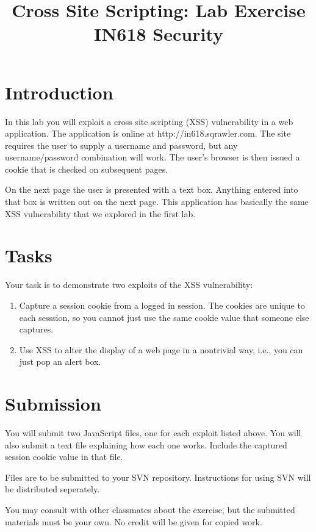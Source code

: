 \documentclass{article}
\begin{document}
\title{Cross Site Scripting: Lab Exercise\\ IN618 Security}
\date{}
\maketitle

\section*{Introduction}
In this lab you will exploit a cross site scripting (XSS) vulnerability in a
web application.  The application is online at http://in618.sqrawler.com.  The
site requires the user to supply a username and password, but any username/password combination
will work.  The user's browser is then issued a cookie that is checked on subsequent pages.

On the next page the user is presented with a text box.  Anything entered into that
box is written out on the next page.  This application has basically the same XSS
vulnerability that we explored in the first lab.

\section{Tasks}
Your task is to demonstrate two exploits of the XSS vulnerability:

\begin{enumerate}
	\item Capture a session cookie from a logged in session.
		The cookies are unique to each sesssion, so you 
		cannot just use the same cookie value that someone
		else captures.
	\item Use XSS to alter the display of a web page in a nontrivial 
		way, i.e., you can just pop an alert box.
\end{enumerate}

\section{Submission}
You will submit two JavaScript files, one for each exploit listed above. You
will also submit a text file explaining how each one works.  Include the captured session 
cookie value in that file.

Files are to be submitted to your SVN repository.  Instructions for using SVN will be
distributed seperately.

You may consult with other classmates about the exercise, but the submitted materials 
must be your own.  No credit will be given for copied work.
\end{document}
